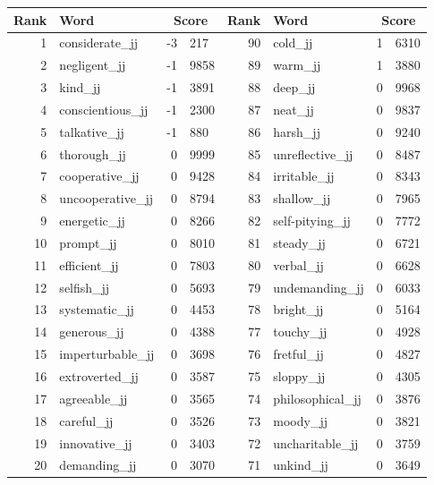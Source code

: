 \begin{table}[tbp]
    \begin{tabular}{| rlr@{.}l | rlr@{.}l |}
    \hline
    \textbf{Rank} & \textbf{Word} & \multicolumn{2}{c|}{\textbf{Score}} & \textbf{Rank} & \textbf{Word} & \multicolumn{2}{c|}{\textbf{Score}} \\
    \hline
    1 & considerate\_jj & -3 & 217    &    90 & cold\_jj & 1 & 6310 \\
    2 & negligent\_jj & -1 & 9858    &    89 & warm\_jj & 1 & 3880 \\
    3 & kind\_jj & -1 & 3891    &    88 & deep\_jj & 0 & 9968 \\
    4 & conscientious\_jj & -1 & 2300    &    87 & neat\_jj & 0 & 9837 \\
    5 & talkative\_jj & -1 & 880    &    86 & harsh\_jj & 0 & 9240 \\
    6 & thorough\_jj & 0 & 9999    &    85 & unreflective\_jj & 0 & 8487 \\
    7 & cooperative\_jj & 0 & 9428    &    84 & irritable\_jj & 0 & 8343 \\
    8 & uncooperative\_jj & 0 & 8794    &    83 & shallow\_jj & 0 & 7965 \\
    9 & energetic\_jj & 0 & 8266    &    82 & self-pitying\_jj & 0 & 7772 \\
    10 & prompt\_jj & 0 & 8010    &    81 & steady\_jj & 0 & 6721 \\
    11 & efficient\_jj & 0 & 7803    &    80 & verbal\_jj & 0 & 6628 \\
    12 & selfish\_jj & 0 & 5693    &    79 & undemanding\_jj & 0 & 6033 \\
    13 & systematic\_jj & 0 & 4453    &    78 & bright\_jj & 0 & 5164 \\
    14 & generous\_jj & 0 & 4388    &    77 & touchy\_jj & 0 & 4928 \\
    15 & imperturbable\_jj & 0 & 3698    &    76 & fretful\_jj & 0 & 4827 \\
    16 & extroverted\_jj & 0 & 3587    &    75 & sloppy\_jj & 0 & 4305 \\
    17 & agreeable\_jj & 0 & 3565    &    74 & philosophical\_jj & 0 & 3876 \\
    18 & careful\_jj & 0 & 3526    &    73 & moody\_jj & 0 & 3821 \\
    19 & innovative\_jj & 0 & 3403    &    72 & uncharitable\_jj & 0 & 3759 \\
    20 & demanding\_jj & 0 & 3070    &    71 & unkind\_jj & 0 & 3649 \\

\end{tabular}
\end{table}
